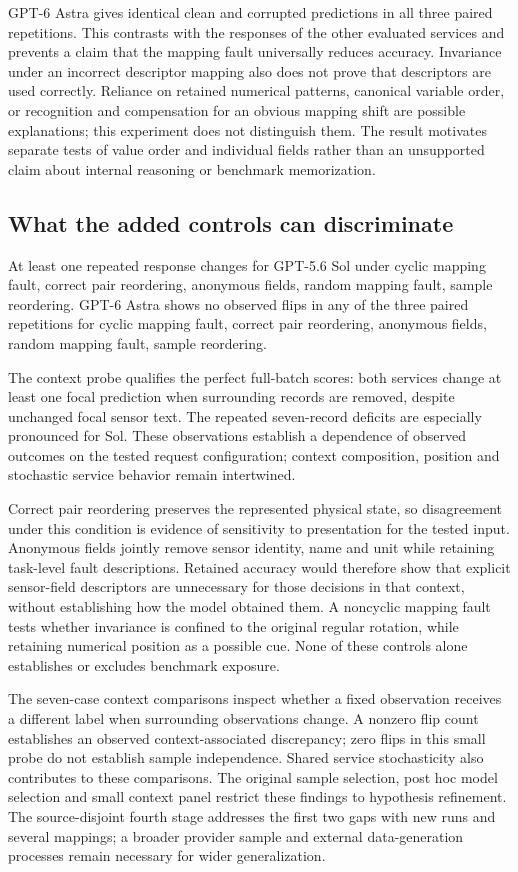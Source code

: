 \documentclass[11pt,a4paper]{article}
\begin{document}
GPT-6 Astra gives identical clean and corrupted predictions in all three paired repetitions. This contrasts with the responses of the other evaluated services and prevents a claim that the mapping fault universally reduces accuracy. Invariance under an incorrect descriptor mapping also does not prove that descriptors are used correctly. Reliance on retained numerical patterns, canonical variable order, or recognition and compensation for an obvious mapping shift are possible explanations; this experiment does not distinguish them. The result motivates separate tests of value order and individual fields rather than an unsupported claim about internal reasoning or benchmark memorization.

\subsection{What the added controls can discriminate}
At least one repeated response changes for GPT-5.6 Sol under cyclic mapping fault, correct pair reordering, anonymous fields, random mapping fault, sample reordering. GPT-6 Astra shows no observed flips in any of the three paired repetitions for cyclic mapping fault, correct pair reordering, anonymous fields, random mapping fault, sample reordering.

The context probe qualifies the perfect full-batch scores: both services change at least one focal prediction when surrounding records are removed, despite unchanged focal sensor text. The repeated seven-record deficits are especially pronounced for Sol. These observations establish a dependence of observed outcomes on the tested request configuration; context composition, position and stochastic service behavior remain intertwined.

Correct pair reordering preserves the represented physical state, so disagreement under this condition is evidence of sensitivity to presentation for the tested input. Anonymous fields jointly remove sensor identity, name and unit while retaining task-level fault descriptions. Retained accuracy would therefore show that explicit sensor-field descriptors are unnecessary for those decisions in that context, without establishing how the model obtained them. A noncyclic mapping fault tests whether invariance is confined to the original regular rotation, while retaining numerical position as a possible cue. None of these controls alone establishes or excludes benchmark exposure.

The seven-case context comparisons inspect whether a fixed observation receives a different label when surrounding observations change. A nonzero flip count establishes an observed context-associated discrepancy; zero flips in this small probe do not establish sample independence. Shared service stochasticity also contributes to these comparisons. The original sample selection, post hoc model selection and small context panel restrict these findings to hypothesis refinement. The source-disjoint fourth stage addresses the first two gaps with new runs and several mappings; a broader provider sample and external data-generation processes remain necessary for wider generalization.
\end{document}
